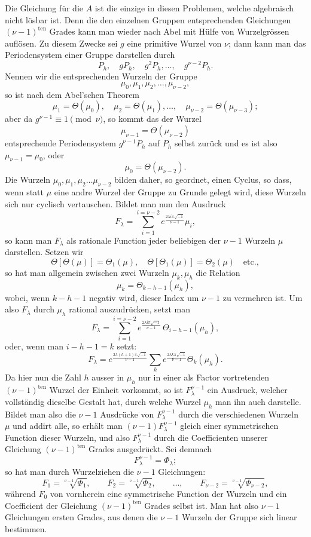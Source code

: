 \documentclass[10pt]{article}
\begin{document}
Die Gleichung für die \(A\) ist die einzige in diesen Problemen, welche algebraisch nicht lösbar ist. Denn die den einzelnen Gruppen entsprechenden Gleichungen \((\nu-1)^{\text{ten}}\) Grades kann man wieder nach Abel mit Hülfe von Wurzelgrössen auflösen. Zu diesem Zwecke sei \(g\) eine primitive Wurzel von \(\nu\); dann kann man das Periodensystem einer Gruppe darstellen durch
\[
P_h,\quad gP_h,\quad g^2P_h,\ldots,\quad g^{\nu-2}P_h.
\]
Nennen wir die entsprechenden Wurzeln der Gruppe
\[
\mu_0,\mu_1,\mu_2,\ldots,\mu_{\nu-2},
\]
so ist nach dem Abel'schen Theorem
\[
\mu_1=\Theta(\mu_0),\quad
\mu_2=\Theta(\mu_1),\ldots,\quad
\mu_{\nu-2}=\Theta(\mu_{\nu-3});
\]
aber da \(g^{\nu-1}\equiv 1\pmod{\nu}\), so kommt das der Wurzel
\[
\mu_{\nu-1}=\Theta(\mu_{\nu-2})
\]
entsprechende Periodensystem \(g^{\nu-1}P_h\) auf \(P_h\) selbst zurück und es ist also \(\mu_{\nu-1}=\mu_0\), oder
\[
\mu_0=\Theta(\mu_{\nu-2}).
\]
Die Wurzeln \(\mu_0,\mu_1,\mu_2\ldots\mu_{\nu-2}\) bilden daher, so geordnet, einen Cyclus, so dass, wenn statt \(\mu\) eine andre Wurzel der Gruppe zu Grunde gelegt wird, diese Wurzeln sich nur cyclisch vertauschen. Bildet man nun den Ausdruck
\[
F_\lambda=\sum_{i=1}^{i=\nu-2}
e^{\frac{2\lambda i\pi\sqrt{-1}}{\nu-1}}\mu_i,
\]
so kann man \(F_\lambda\) als rationale Function jeder beliebigen der \(\nu-1\) Wurzeln \(\mu\) darstellen. Setzen wir
\[
\Theta[\Theta(\mu)]=\Theta_1(\mu),\quad
\Theta[\Theta_1(\mu)]=\Theta_2(\mu)\quad\text{etc.},
\]
so hat man allgemein zwischen zwei Wurzeln \(\mu_k,\mu_h\) die Relation
\[
\mu_k=\Theta_{k-h-1}(\mu_h),
\]
wobei, wenn \(k-h-1\) negativ wird, dieser Index um \(\nu-1\) zu vermehren ist. Um also \(F_\lambda\) durch \(\mu_h\) rational auszudrücken, setzt man
\[
F_\lambda=
\sum_{i=1}^{i=\nu-2}
e^{\frac{2\lambda i\pi\sqrt{-1}}{\nu-1}}\,
\Theta_{i-h-1}(\mu_h),
\]
oder, wenn man \(i-h-1=k\) setzt:
\[
F_\lambda=
e^{\frac{2\lambda(h+1)\pi\sqrt{-1}}{\nu-1}}
\sum_{k}
e^{\frac{2\lambda k\pi\sqrt{-1}}{\nu-1}}\Theta_k(\mu_h).
\]
Da hier nun die Zahl \(h\) ausser in \(\mu_h\) nur in einer als Factor vortretenden \((\nu-1)^{\text{ten}}\) Wurzel der Einheit vorkommt, so ist \(F_\lambda^{\nu-1}\) ein Ausdruck, welcher vollständig dieselbe Gestalt hat, durch welche Wurzel \(\mu_h\) man ihn auch darstelle. Bildet man also die \(\nu-1\) Ausdrücke von \(F_\lambda^{\nu-1}\) durch die verschiedenen Wurzeln \(\mu\) und addirt alle, so erhält man \((\nu-1)F_\lambda^{\nu-1}\) gleich einer symmetrischen Function dieser Wurzeln, und also \(F_\lambda^{\nu-1}\) durch die Coefficienten unserer Gleichung \((\nu-1)^{\text{ten}}\) Grades ausgedrückt. Sei demnach
\[
F_\lambda^{\nu-1}=\Phi_\lambda;
\]
so hat man durch Wurzelziehen die \(\nu-1\) Gleichungen:
\[
F_1=\sqrt[\nu-1]{\Phi_1},\qquad
F_2=\sqrt[\nu-1]{\Phi_2},\qquad
\ldots,\qquad
F_{\nu-2}=\sqrt[\nu-1]{\Phi_{\nu-2}},
\]
während \(F_0\) von vornherein eine symmetrische Function der Wurzeln und ein Coefficient der Gleichung \((\nu-1)^{\text{ten}}\) Grades selbst ist. Man hat also \(\nu-1\) Gleichungen ersten Grades, aus denen die \(\nu-1\) Wurzeln der Gruppe sich linear bestimmen.
\end{document}
